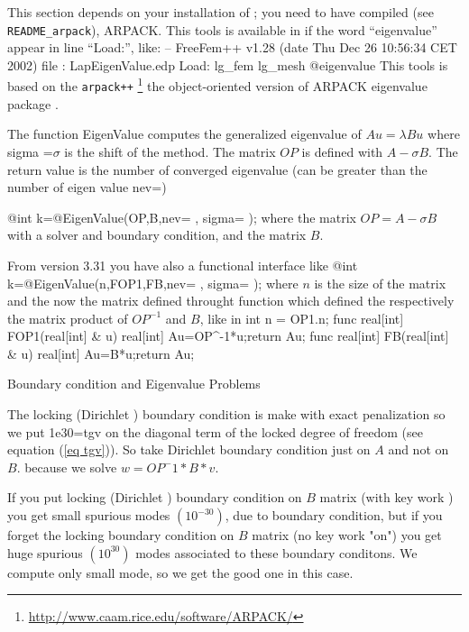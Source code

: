 \documentclass[a4paper,twoside,12pt]{book}
\begin{document}
This section depends on your installation of \freefempp; you need to have compiled (see \texttt{README\_arpack}),
ARPACK.
This tools is available in \freefempp  if the word ``eigenvalue'' appear in line ``Load:'', like:
\bFF
-- FreeFem++ v1.28 (date Thu Dec 26 10:56:34 CET 2002)
 file : LapEigenValue.edp
 Load: lg_fem lg_mesh @eigenvalue
\eFF
This tools is based on the \texttt{arpack++} \footnote{\url{http://www.caam.rice.edu/software/ARPACK/}}
the object-oriented version of ARPACK eigenvalue package \cite{arpack}.

The function EigenValue computes the generalized eigenvalue
of  $ A u = \lambda B u $ where sigma =$\sigma$ is the shift of the method.
The matrix  $ OP$ is defined with $ A - \sigma B $.
The return value is the number of converged eigenvalue (can be greater than the number of eigen value nev=)

\bFF
@int k=@EigenValue(OP,B,nev= , sigma= );
\eFF
where the matrix $OP=  A - \sigma B $ with a solver and boundary condition,
and the matrix $B$.

From version 3.31 you have also a functional interface like
\bFF
@int k=@EigenValue(n,FOP1,FB,nev= , sigma= );
\eFF
where $n$ is the size of the matrix and  the now the matrix defined throught function 
which defined the respectively the matrix product of $OP^{-1}$ and $B$, like in 
\bFF
int n = OP1.n; 
func real[int] FOP1(real[int] & u) { real[int] Au=OP^-1*u;return Au;}
func real[int] FB(real[int] & u) { real[int] Au=B*u;return Au;}
\eFF

\begin{note}{Boundary condition and Eigenvalue Problems\label{note BC EV}}\label{pp BC EV}

 The locking (Dirichlet ) boundary condition is make with exact penalization
 so   we put 1e30=tgv  on the diagonal term of the locked degree of freedom (see equation  (\ref{eq tgv})).
  So take Dirichlet boundary condition just on $A$
  and not on  $B$.
  because we solve $ w=OP^-1*B*v$.

  If you put  locking  (Dirichlet )  boundary condition on $B$ matrix  (with key work )
you get small spurious modes $(10^{-30})$, due to boundary condition, but if you forget the locking boundary condition on $B$ matrix  (no  key work "on")
you get huge spurious $(10^{30})$  modes associated to these boundary conditons.
We compute only small mode, so we get the good  one in this case.

\end{note}
\end{document}
